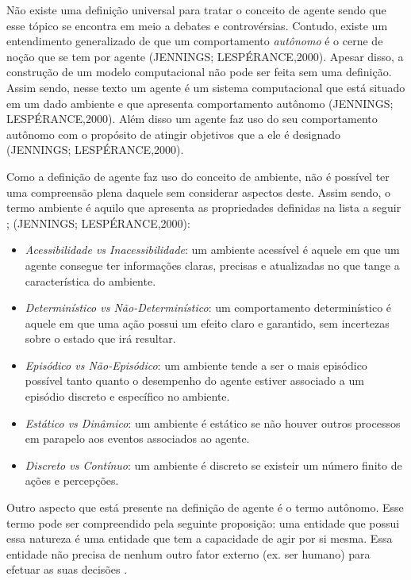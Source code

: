 Não existe uma definição universal para tratar o conceito de agente sendo que esse tópico se encontra em meio a debates e controvérsias. Contudo, existe um entendimento generalizado de que um comportamento \textit{autônomo} é o cerne de noção que se tem por agente (JENNINGS; LESPÉRANCE,2000). Apesar disso, a construção de um modelo computacional não pode ser feita sem uma definição. Assim sendo, nesse texto um agente é um sistema computacional que está situado em um dado ambiente e que apresenta comportamento autônomo (JENNINGS; LESPÉRANCE,2000). Além disso um agente faz uso do seu comportamento autônomo com o propósito de atingir objetivos que a ele é designado (JENNINGS; LESPÉRANCE,2000).

Como a definição de agente faz uso do conceito de ambiente, não é possível ter uma compreensão plena daquele sem considerar aspectos deste. Assim sendo, o termo ambiente  é aquilo que apresenta as propriedades definidas na lista a seguir \cite{artificialinteligencemodermapproach}; (JENNINGS; LESPÉRANCE,2000): 
\begin{itemize}
    \item \textit{Acessibilidade vs Inacessibilidade}: um ambiente acessível é aquele em que um agente consegue ter informações claras, precisas e atualizadas no que tange a característica do ambiente.
    \item \textit{Determinístico vs Não-Determinístico}: um comportamento determinístico é aquele em que uma ação possui um efeito claro e garantido, sem incertezas sobre o estado que irá resultar.
    \item \textit{Episódico vs Não-Episódico}: um ambiente tende a ser o mais episódico possível tanto quanto o desempenho do agente estiver associado a um episódio discreto e específico no ambiente.
    \item \textit{Estático vs Dinâmico}: um ambiente é estático se não houver outros processos em parapelo aos eventos associados ao agente.
    \item \textit{Discreto vs Contínuo}: um ambiente é discreto se existeir um número finito de ações e percepções. 
\end{itemize}

Outro aspecto que está presente na definição de agente é o termo autônomo. Esse termo pode ser compreendido pela seguinte proposição: uma entidade que possui essa natureza é uma entidade que tem a capacidade de agir por si mesma. Essa entidade não precisa de nenhum outro fator externo (ex. ser humano) para efetuar as suas decisões \cite{whatisagent}.

